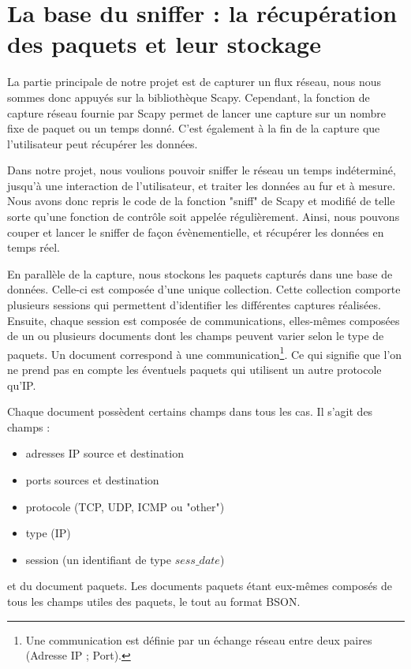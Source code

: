 \section{La base du sniffer : la récupération des paquets et leur stockage}

La partie principale de notre projet est de capturer un flux réseau, nous nous sommes donc appuyés sur la bibliothèque Scapy. Cependant, la fonction de capture
réseau fournie par Scapy permet de lancer une capture sur un nombre fixe de paquet ou un temps donné. C'est également à la fin de la capture que l'utilisateur peut récupérer les données. 

Dans notre projet, nous voulions pouvoir sniffer
le réseau un temps indéterminé, jusqu'à une interaction de l'utilisateur, et traiter les données au fur et à mesure. Nous avons donc repris le code de la fonction "sniff" de Scapy et modifié de telle sorte
qu'une fonction de contrôle soit appelée régulièrement. Ainsi, nous pouvons couper et lancer le sniffer de façon évènementielle, et récupérer les données en temps réel. 

En parallèle de la capture, nous stockons les paquets capturés dans une base de données. Celle-ci est composée d'une unique collection. Cette collection comporte plusieurs sessions qui permettent d'identifier les différentes captures réalisées. Ensuite, chaque session est composée de communications, elles-mêmes composées de un ou plusieurs documents dont les champs peuvent varier selon le type de paquets. Un document correspond à une communication\footnote{Une communication est définie par un échange réseau entre deux paires (Adresse IP ; Port).}. Ce qui signifie que l'on ne prend pas en compte les éventuels paquets qui utilisent un autre protocole qu'IP.

Chaque document possèdent certains champs dans tous les cas. Il s'agit des champs :
\begin{itemize}
\item adresses IP source et destination
\item ports sources et destination 
\item protocole (TCP, UDP, ICMP ou "other")
\item type (IP)
\item session (un identifiant de type $sess\_date$)
\end{itemize}

et du document paquets.
Les documents paquets étant eux-mêmes composés de tous les champs utiles des paquets, le tout au format BSON.


